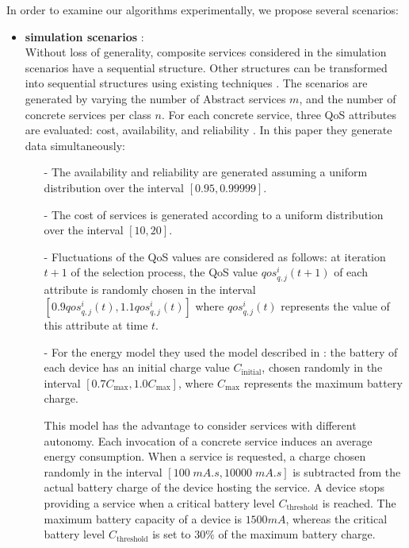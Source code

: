 \documentclass[10pt,journal,compsoc]{IEEEtran}
\begin{document}
{\color{blue} In order to examine our algorithms experimentally, we propose several scenarios:}

\begin{itemize}
\item \textbf{simulation scenarios\cite{DBLP:journals/tase/KhanoucheACKY16} } :\\
 Without loss of generality, composite services considered in the simulation scenarios have a sequential structure. Other structures can be transformed into sequential structures using existing techniques \cite{journals/ws/CardosoSMAK04}. The scenarios are generated by varying the number of Abstract services $m$, and the number of concrete services per class $n$. For each concrete service, three QoS attributes are evaluated: cost, availability, and reliability \cite{DBLP:journals/tase/KhanoucheACKY16}. In this paper they generate data simultaneously:
\begin{itemize}
\item[-] The availability and reliability are generated assuming a uniform distribution over the interval $[0.95, 0.99999]$.
\item[-] The cost of services is generated according to a uniform distribution over the interval $[10, 20]$.
\item[-] Fluctuations of the QoS values are considered as follows: at iteration $t+1$ of the selection process, the QoS value $qos_{q,j}^i (t+1)$ of each attribute is randomly chosen in the interval $[0.9 qos_{q,j}^i(t), 1.1 qos_{q,j}^i(t)]$ where $qos_{q,j}^i(t)$ represents the value of this attribute at time $t$.
\item[-]For the energy model they used the model described in \cite{Flinn:1999:EAM:319344.319155}: the battery of each device has an initial charge value $C_{\text{initial}}$, chosen randomly in the interval $[0.7 C_{\text{max}}, 1.0 C_{\text{max}}]$, where $C_{\text{max}}$ represents the maximum battery charge. 

This model has the advantage to consider services with different autonomy. Each invocation of a concrete service induces an average energy consumption. When a service is requested, a charge chosen randomly in the interval $[100 \; mA.s, 10000 \; mA.s]$ is subtracted from the actual battery charge of the device hosting the service. A device stops providing a service when a critical battery level $C_{\text{threshold}}$ is reached. The maximum battery capacity of a device is $1500 mA$, whereas the critical battery level $C_{\text{threshold}}$ is set to $30\%$ of the maximum battery charge.


\end{itemize}
\end{itemize}
\end{document}
